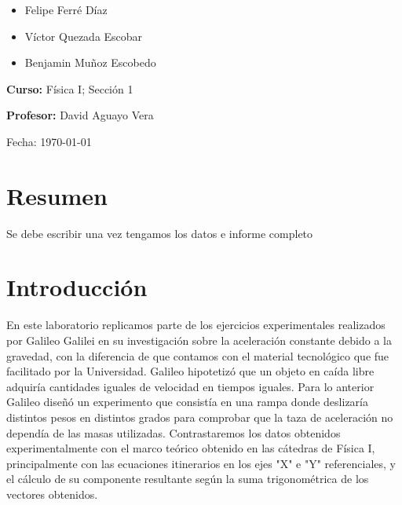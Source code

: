 \documentclass[twocolumn,12pt]{article}
\begin{document}
\begin{titlepage}
\begin{flushleft}
			\begin{itemize}
				\item Felipe Ferré Díaz
				\item Víctor Quezada Escobar
				\item Benjamin Muñoz Escobedo
			\end{itemize}
			
			\vspace{0.2in}
			
			\large
			\textbf{Curso:} Física I; Sección 1
			
			\vspace{0.2in}
			
			\large
			\textbf{Profesor:} David Aguayo Vera
		\end{flushleft}
		
		\vspace{0.2in}
		
		\begin{flushright}
			\Large
			Fecha: \today %
		\end{flushright}
		
		
		
		\vspace{1in}
	\end{titlepage}
	
	\section{Resumen}
	Se debe escribir una vez tengamos los datos e informe completo
	
	\section{Introducción}
	En este laboratorio replicamos parte de los ejercicios experimentales realizados por Galileo Galilei en su investigación sobre la aceleración constante debido a la gravedad, con la diferencia de que contamos con el material tecnológico que fue facilitado por la Universidad. Galileo hipotetizó que un objeto en caída libre adquiría cantidades iguales de velocidad en tiempos iguales. Para lo anterior Galileo diseñó un experimento que consistía en una rampa donde deslizaría distintos pesos en distintos grados para comprobar que la taza de aceleración no dependía de las masas utilizadas. Contrastaremos los datos obtenidos experimentalmente con el marco teórico obtenido en las cátedras de Física I, principalmente con las ecuaciones itinerarios en los ejes "X" e "Y" referenciales, y el cálculo de su componente resultante según la suma trigonométrica de los vectores obtenidos.
		
\end{document}
